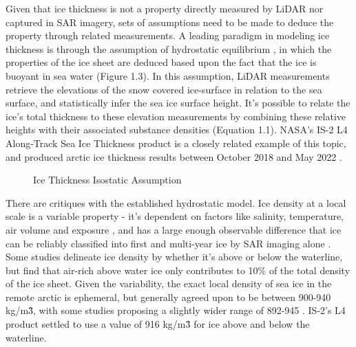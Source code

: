  \indent Given that ice thickness is not a property directly measured by LiDAR nor captured in SAR imagery, sets of assumptions need to be made to deduce the property through related measurements. A leading paradigm in modeling ice thickness is through the assumption of hydrostatic equilibrium \cite{ICESat-2-L4-Product} \cite{Hutchings_Heil_Lecomte_Stevens_Steer_Lieser_2015} \cite{Forsström_Gerland_Pedersen_2011}, in which the properties of the ice sheet are deduced based upon the fact that the ice is buoyant in sea water (Figure 1.3). In this assumption, LiDAR measurements retrieve the elevations of the snow covered ice-surface in relation to the sea surface, and statistically infer the sea ice surface height. It's possible to relate the ice's total thickness to these elevation measurements by combining these relative heights with their associated substance densities (Equation 1.1). NASA's IS-2 L4 Along-Track Sea Ice Thickness product is a closely related example of this topic, and produced arctic ice thickness results between October 2018 and May 2022 \cite{ICESat-2-L4-Product}.
 \begin{figure}[htb]
	\centering
	\caption{Ice Thickness Isostatic Assumption} \cite{ICESat-2-L4-Product}
	\label{fig:hydro-static-diagram}
\end{figure}

There are critiques with the established hydrostatic model. Ice density at a local scale is a variable property - it's dependent on factors like salinity, temperature, air volume and exposure \cite{sea-ice-properties}, and has a large enough observable difference that ice can be reliably classified into first and multi-year ice by SAR imaging alone \cite{SAR-U-Net}. Some studies delineate ice density by whether it's above or below the waterline, but find that air-rich above water ice only contributes to 10\% of the total density of the ice sheet. Given the variability, the exact local density of sea ice in the remote arctic is ephemeral, but generally agreed upon to be between 900-940 kg/m\^3, with some studies proposing a slightly wider range of 892-945 \cite{sea-ice-properties}. IS-2's L4 product settled to use a value of 916 kg/m\^3 for ice above and below the waterline.

